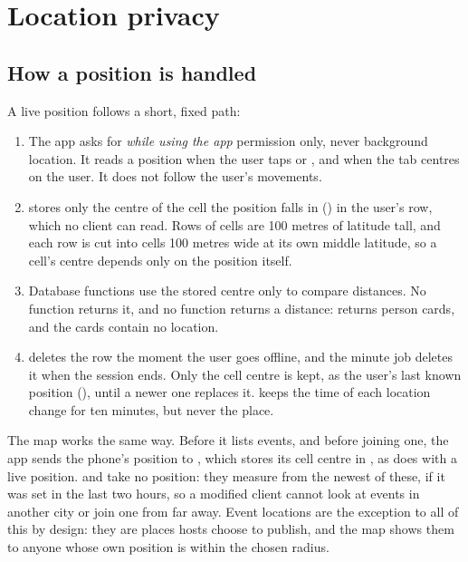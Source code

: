 \section{Location privacy}
\label{sec:location-privacy}

\subsection{How a position is handled}

A live position follows a short, fixed path:

\begin{enumerate}
  \item The app asks for \emph{while using the app} permission only, never background location. It reads a
    position when the user taps  or , and when the  tab centres on the user. It
    does not follow the user's movements.
  \item {} stores only the centre of the cell the position falls in
    () in the user's  row, which no client can read. Rows of
    cells are 100 metres of latitude tall, and each row is cut into cells 100 metres wide at its own middle
    latitude, so a cell's centre depends only on the position itself.
  \item Database functions use the stored centre only to compare distances. No function returns it, and no
    function returns a distance:  returns person cards, and the cards contain no location.
  \item {} deletes the row the moment the user goes offline, and the minute job deletes it
    when the session ends. Only the cell centre is kept, as the user's last known position
    (), until a newer one replaces it.  keeps
    the time of each location change for ten minutes, but never the place.
\end{enumerate}

The map works the same way. Before it lists events, and before joining one, the app sends the phone's
position to , which stores its cell centre in , as
 does with a live position.  and  take no position:
they measure from the newest of these, if it was set in the last two hours, so a modified client cannot
look at events in another city or join one from far away. Event locations are the
exception to all of this by design: they are places hosts choose to publish, and the map shows them to
anyone whose own position is within the chosen radius.

